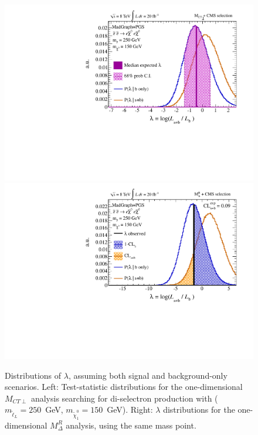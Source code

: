 \begin{figure}[ht]
\includegraphics[width=0.35\columnwidth]{fig/sectionIV/BELLS1D_exp_selectron250_150_ANA2.pdf}
\includegraphics[width=0.35\columnwidth]{fig/sectionIV/BELLS1D_obs_selectron250_150_ANA0.pdf}
\caption{Distributions of $\lambda$, assuming both signal and background-only scenarios. Left: Test-statistic distributions for the one-dimensional $M_{CT\perp}$ analysis searching for di-selectron production with ($m_{\tilde{\ell}_L}=250$~GeV, $m_{\tilde{\chi}^{0}_{1}}=150$~GeV). Right: $\lambda$ distributions for the one-dimensional $M_{\Delta}^{R}$ analysis, using the same mass point. \label{fig:bells}}
\end{figure}

